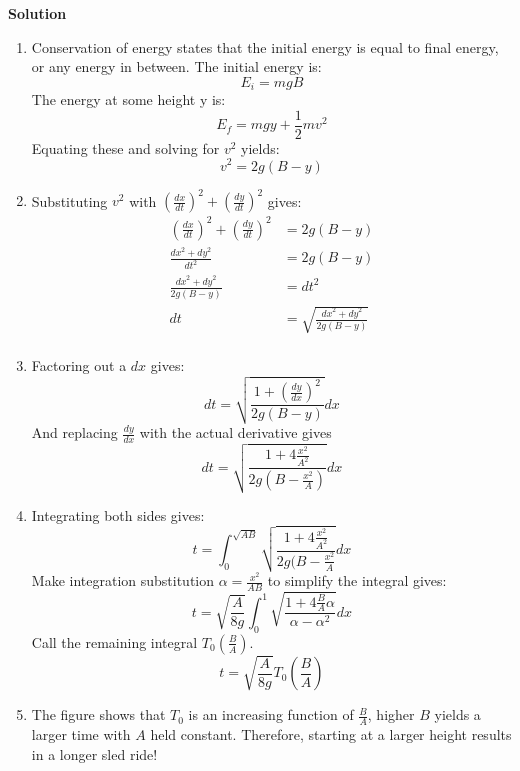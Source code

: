 \documentclass{article}
\begin{document}
\newpage
\thispagestyle{empty}
\textbf{Solution}
\begin{enumerate}
  \item
    Conservation of energy states that the initial energy is equal to final energy, or any energy in between. The initial energy is:
    \begin{equation*}
      E_{i} = mgB
    \end{equation*}
    The energy at some height y is:
    \begin{equation*}
      E_{f} = mgy + \frac{1}{2}mv^2
    \end{equation*}
    Equating these and solving for $v^2$ yields:
    \begin{equation*}
      v^2=2g(B-y)
    \end{equation*}
  \item
    Substituting $v^2$ with $(\frac{dx}{dt})^2 + (\frac{dy}{dt})^2$ gives:
    \begin{align*}
      (\frac{dx}{dt})^2 + (\frac{dy}{dt})^2&=2g(B-y) \\
      \frac{ {dx}^2 +{dy}^2 }{ {dt}^2 } &=2g(B-y)    \\
      \frac{ {dx}^2 +{dy}^2 }{ 2g(B-y) } &={dt}^2    \\
      dt&=\sqrt{ \frac{ {dx}^2 +{dy}^2 }{ 2g(B-y) } }\\
    \end{align*}
  \item
    Factoring out a $dx$ gives:
    \begin{equation*}
      dt=\sqrt{ \frac{ 1 +(\frac{dy}{dx})^2 }{ 2g(B-y) } }dx
    \end{equation*}
    And replacing $\frac{dy}{dx}$ with the actual derivative gives
    \begin{equation*}
      dt=\sqrt{ \frac{ 1 +4\frac{x^2}{A^2} }{ 2g(B-\frac{x^2}{A}) } }dx
    \end{equation*}
  \item
    Integrating both sides gives:
    \begin{equation*}
      t = \int_{0}^{\sqrt{AB}}\sqrt{\frac{1+4\frac{x^2}{A^2}}{2g(B-\frac{x^2}{A}}}dx
    \end{equation*}
    Make integration substitution $\alpha=\frac{x^2}{AB}$ to simplify the integral gives:
    \begin{equation*}
      t =\sqrt{\frac{A}{8g}} \int_{0}^{1}\sqrt{\frac{1+4\frac{B}{A}\alpha}{\alpha-\alpha^2}}dx
    \end{equation*}
    Call the remaining integral $T_0(\frac{B}{A})$.
    \begin{equation*}
      t =\sqrt{\frac{A}{8g}} {T_0}\left(\frac{B}{A}\right)
    \end{equation*}

  \item
    The figure shows that $T_0$ is an increasing function of $\frac{B}{A}$, higher $B$ yields a larger time with $A$ held constant. Therefore, starting at a larger height results in a longer sled ride! \Smiley

\end{enumerate}
\end{document}

